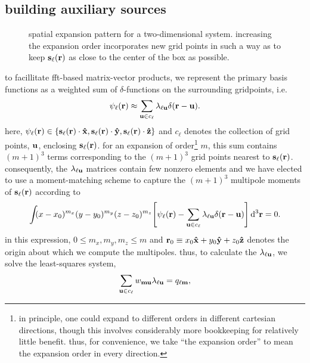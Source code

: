 \subsection{building auxiliary sources}

\begin{figure}
  \centering
  \caption{\label{fig:expansion grid}spatial expansion pattern for a two-dimensional system.
    increasing the expansion order incorporates new grid points in such a way as to keep $\vb{s}_\ell(\vb{r})$ as close to the center of the box as possible.
  }
\end{figure}

to facillitate fft-based matrix-vector products, we represent the primary basis functions as a weighted sum of $\delta$-functions on the surrounding gridpoints, i.e.
\begin{equation}
  \psi_\ell(\vb{r}) \approx \sum_{\vb{u} \in c_{\ell}} \lambda_{\ell\vb{u}} \delta(\vb{r} - \vb{u}).
  \label{eq:grid linear combination}
\end{equation}
here, $\psi_\ell(\vb{r}) \in \qty{\vb{s}_\ell(\vb{r})\cdot \vu{x}, \vb{s}_\ell(\vb{r}) \cdot \vu{y}, \vb{s}_\ell(\vb{r}) \cdot \vu{z}}$ and $c_\ell$ denotes the collection of grid points, $\vb{u}$, enclosing $\vb{s}_\ell(\vb{r})$.
for an expansion of order\footnote{in principle, one could expand to different orders in different cartesian directions, though this involves considerably more bookkeeping for relatively little benefit. thus, for convenience, we take ``the expansion order'' to mean the expansion order in every direction.} $m$, this sum contains $(m + 1)^3$ terms corresponding to the $(m + 1)^3$ grid points nearest to $\vb{s}_\ell(\vb{r})$.
consequently, the $\lambda_{\ell \vb{u}}$ matrices contain few nonzero elements and we have elected to use a moment-matching scheme to capture the $(m + 1)^3$ multipole moments of $\vb{s}_\ell(\vb{r})$ according to
\begin{equation}
  \int_{} \kern0.1em (x - x_0)^{m_x}(y - y_0)^{m_y}(z - z_0)^{m_z} \qty[\psi_\ell(\vb{r}) - \sum_{\vb{u} \in c_\ell}\lambda_{\ell\vb{u}}\delta(\vb{r} - \vb{u})] \dd[3]{\vb{r}} = 0.
  \label{eq:moment matching}
\end{equation}
in this expression, $0 \leqslant m_x, m_y, m_z \leqslant m$ and $\vb{r}_0 \equiv x_0 \vu{x} + y_0 \vu{y} + z_0\vu{z}$ denotes the origin about which we compute the multipoles.
thus, to calculate the $\lambda_{\ell \vb{u}}$, we solve the least-squares system,
\begin{equation}
  \sum_{\vb{u} \in c_\ell} w_{\vb{m}\vb{u}}\lambda_{\ell\vb{u}} = q_{\ell\vb{m}},
  \label{eq:expansion matrix system}
\end{equation}
